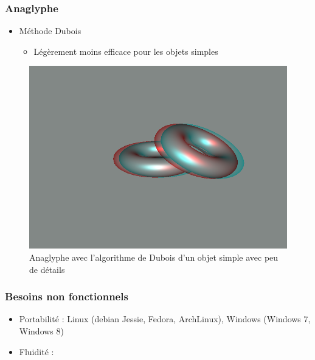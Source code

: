 \documentclass{beamer}
\begin{document}
%
% 
\begin{frame}
\frametitle{Anaglyphe}
\begin{itemize}[label=$\bullet$]
\item Méthode Dubois \cite{algoDubois}
	\begin{itemize}[label=$\circ$]
	\item Légèrement moins efficace pour les objets simples 
	\end{itemize}
\end{itemize}
\begin{figure}
\centering
\includegraphics[scale=0.35]{donuts_dubois.png}
\caption{Anaglyphe avec l'algorithme de Dubois d'un objet simple avec peu de détails}
\end{figure}
\end{frame}

\begin{frame}
\frametitle{Besoins non fonctionnels}
\begin{itemize}[label=$\bullet$]
 	\item Portabilité : Linux (debian Jessie, Fedora, ArchLinux), Windows (Windows 7, Windows 8)
	\item Fluidité : 
\end{itemize}

\end{frame}

\end{document}
